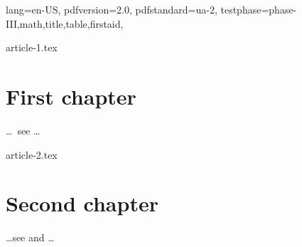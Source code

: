 \DocumentMetadata
  {
    lang=en-US,
    pdfversion=2.0,
    pdfstandard=ua-2,
    testphase={phase-III,math,title,table,firstaid},
  }
\begin{filecontents}[force]{article-1.tex}
\chapter{First chapter}
\ldots\ see \cite{inbook-full} \ldots


\end{filecontents}
\begin{filecontents}[force]{article-2.tex}
\chapter{Second chapter}
\ldots see \cite{inbook-full}
and \cite{article-full} \ldots


\end{filecontents}
\documentclass{report}

\usepackage[
  gather %
  ]{chapterbib} 






